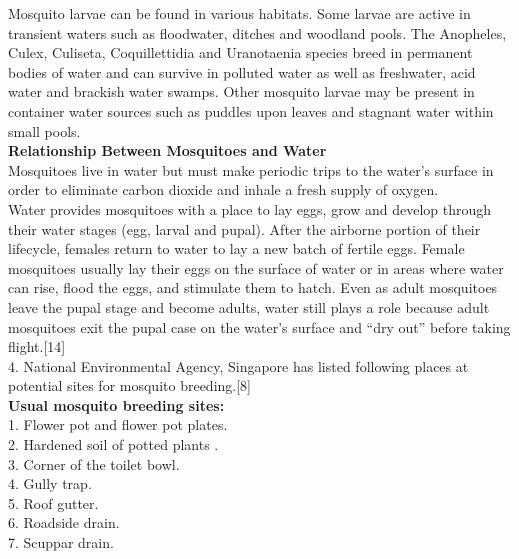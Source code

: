 \documentclass[11pt]{exam}
\begin{document}
\begin{questions}
Mosquito larvae can be found in various habitats. Some larvae are active in transient waters such as floodwater, ditches and woodland pools. The Anopheles, Culex, Culiseta, Coquillettidia and Uranotaenia species breed in permanent bodies of water and can survive in polluted water as well as freshwater, acid water and brackish water swamps. Other mosquito larvae may be present in container water sources such as puddles upon leaves and stagnant water within small pools.\\

\textbf{Relationship Between Mosquitoes and Water} \\
Mosquitoes live in water but must make periodic trips to the water’s surface in order to eliminate carbon dioxide and inhale a fresh supply of oxygen.\\
Water provides mosquitoes with a place to lay eggs, grow and develop through their water stages (egg, larval and pupal). After the airborne portion of their lifecycle, females return to water to lay a new batch of fertile eggs. Female mosquitoes usually lay their eggs on the surface of water or in areas where water can rise, flood the eggs, and stimulate them to hatch. Even as adult mosquitoes leave the pupal stage and become adults, water still plays a role because adult mosquitoes exit the pupal case on the water’s surface and “dry out” before taking flight.[14] \\
4. National Environmental Agency, Singapore has listed following places at potential sites for mosquito breeding.[8]\\
  \textbf{Usual mosquito breeding sites:\\ }             
  1. Flower pot and flower pot plates. \\     
  2. Hardened soil of potted plants .\\       
  3. Corner of the toilet bowl. \\
  4. Gully trap. \\
  5. Roof gutter. \\
  6. Roadside drain. \\
  7. Scuppar drain. \\ 
    

\end{questions}
\end{document}
